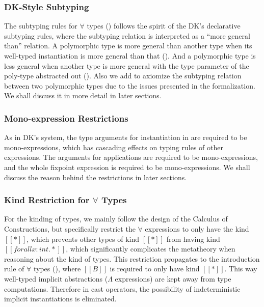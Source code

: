 \subsubsection{DK-Style Subtyping}

The subtyping rules for $\forall$ types () follows
the spirit of the DK's declarative subtyping rules\cite{DunfieldJoshua2013Caeb},
where the subtyping relation is interpreted as a ``more general than'' relation.
A polymorphic type is more general than another type when its well-typed
instantiation is more general than that (). And a polymorphic
type is less general when another type is more general with the type parameter of
the poly-type abstracted out (). Also we add 
to axiomize the subtyping relation between two polymorphic types due to the
issues presented in the formalization.
We shall discuss it in more detail in later sections.


\subsubsection{Mono-expression Restrictions}

As in DK's system, the type arguments for instantiation in  are
required to be mono-expressions, which has cascading effects on typing rules of
other expressions. The arguments for applications are required to be
mono-expressions, and the whole fixpoint expression is required to be mono-expressions. We shall
discuss the reason behind the restrictions in later sections.

\subsubsection{Kind Restriction for $\forall$ Types}
\label{sec:kind-restriction}

For the kinding of types, we mainly follow the design of the Calculus of
Constructions\cite{CoquandThierry1988Tcoc}, but specifically restrict the $\forall$
expressions to only have the kind $[[*]]$, which prevents other types of kind
$[[*]]$ from having kind $[[forall x : int. *]]$, which significantly complicates
the metatheory when reasoning about the kind of types.
This restriction propagates to the introduction rule of $\forall$ types (),
where $[[B]]$ is required to only have kind $[[*]]$.
This way well-typed implicit abstractions ($\Lambda$ expressions) are kept away
from type computations. Therefore in cast operators,
the possibility of indeterministic implicit instantiations is eliminated.

